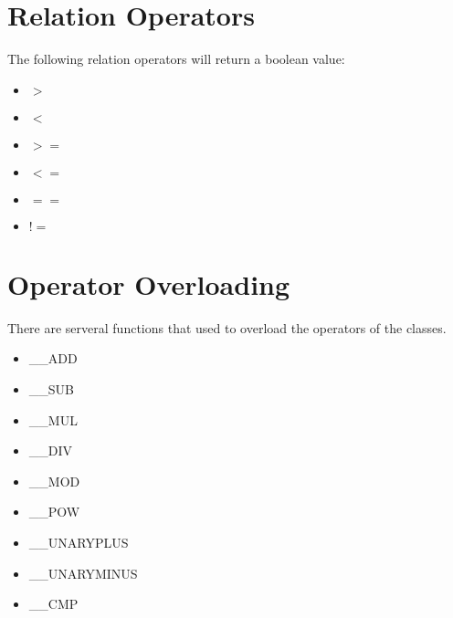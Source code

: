 \section{Relation Operators}
The following relation operators will return a boolean value:
\begin{itemize}
	\item $>$
	\item $<$
	\item $>=$
	\item $<=$
	\item $==$
	\item $!=$
\end{itemize}
\section{Operator Overloading}
There are serveral functions that used to overload the operators of the classes.
\begin{itemize}
	\item \_\_ADD
	\item \_\_SUB
	\item \_\_MUL
	\item \_\_DIV
	\item \_\_MOD
	\item \_\_POW
	\item \_\_UNARYPLUS
	\item \_\_UNARYMINUS
	\item \_\_CMP
\end{itemize}
